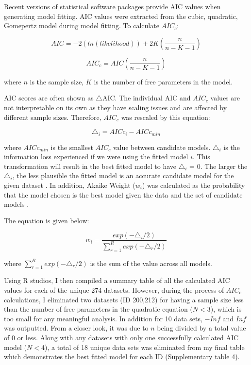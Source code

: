 \documentclass[11pt]{article}
\begin{document}
Recent versions of statistical software packages provide AIC values when generating model fitting. AIC values were extracted 
from the cubic, quadratic, Gomepertz model during model fitting. To calculate $AIC_{c}$: 

    \begin{equation}    
    AIC = -2(ln(likelihood))+2K(\frac{n}{n-K-1})
    \end{equation}

    \begin{equation}    
    AIC_{c}= AIC(\frac{n}{n-K-1})
    \end{equation}

\noindent where $n$ is the sample size, $K$ is the number of free parameters in the model.

AIC scores are often shown as $\triangle$AIC. The individual AIC and $AIC_{c}$ values are not interpretable on its own as they have scaling 
issues and are affected by different sample sizes. Therefore, $AIC_{c}$ was rescaled by this equation: 

    \begin{equation}    
    \triangle_{i}= AICc_{i} - AICc_{min}
    \end{equation}

\noindent where $AICc_{min}$ is the smallest $AIC_{c}$ value between candidate models. $\triangle_{i}$ is the information loss experienced if we were 
using the fitted model $i$. This transformation will result in the best fitted model to have $\triangle_{i}$ = 0. The larger the $\triangle_{i}$, the less 
plausible the fitted model is an accurate candidate model for the given dataset \cite{burnham_multimodel_2004}. In addition, Akaike Weight ($w_{i}$) was calculated as 
the probability that the model chosen is the best model given the data and the set of candidate models \cite{wagenmakers_aic_2004}.

The equation is given below:

    \begin{equation}    
    w_{i}= \frac{exp(-\triangle_{i}/2)}{\sum_{r=1}^{R}exp(-\triangle_{r}/2)}
    \end{equation}

\noindent where $\sum_{r=1}^{R}exp(-\triangle_{r}/2)$ is the sum of the value across all models.  

Using R studios, I then compiled a summary table of all the calculated AIC values for each of the unique 274 datasets. 
However, during the process of $AIC_{c}$ calculations, I eliminated two datasets (ID 200,212) for having a sample size 
less than the number of free parameters in the quadratic equation ($N<$3), which is too small for any meaningful analysis. 
In addition for 10 data sets, $-Inf$ and $Inf$ was outputted. From a closer look, it was due to $n$ being divided by a total value 
of 0 or less. Along with any datasets with only one successfully calculated AIC model ($N<$4), a total of 18 unique data 
sets was eliminated from my final table which demonstrates the best fitted model for each ID (Supplementary table 4). 
\end{document}
